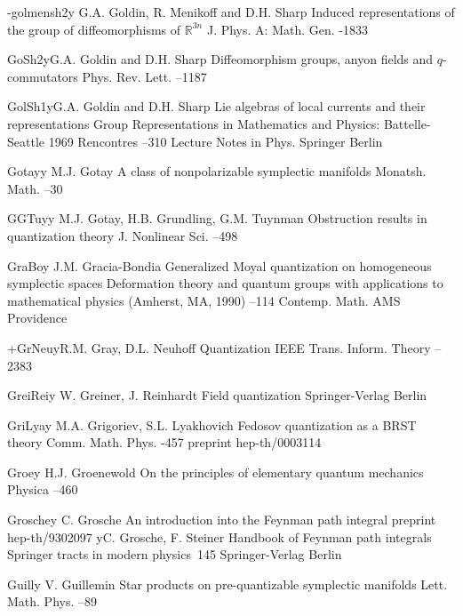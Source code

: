 \documentclass[11pt]{amsart}
\numberwithin{equation}{section}
\theoremstyle{remark}
\newcommand{\by}{\mathbf y}
\begin{document}
\begin{thebibliography}{199}
 -golmensh2\by{ G.A. Goldin, R. Menikoff and D.H. Sharp \paper Induced
representations of the group of diffeomorphisms of ${\mathbb R}^{3n}$ \jour J.
Phys. A: Math. Gen.   -1833}


 GoSh2\by{G.A. Goldin and D.H. Sharp \paper Diffeomorphism groups, anyon fields and
$q$-commutators \jour Phys. Rev. Lett.   --1187}

 GolSh1\by{G.A. Goldin and D.H. Sharp \paper Lie algebras of local currents
and their representations \inbook Group Representations in Mathematics and Physics:
Battelle-Seattle 1969 Rencontres --310 \bookinfo Lecture Notes in Phys. 
\publ Springer \publaddr Berlin }


 Gotay\by{ M.J. Gotay \paper A class of nonpolarizable symplectic
manifolds \jour Monatsh. Math.   --30}

 GGTuy\by{ M.J. Gotay, H.B. Grundling, G.M. Tuynman \paper Obstruction
results in quantization theory \jour J. Nonlinear Sci.   --498}

 GraBo\by{ J.M. Gracia-Bondia \paper Generalized Moyal quantization on
homogeneous symplectic spaces \inbook Deformation theory and quantum groups
with applications to mathematical physics (Amherst, MA, 1990) --114
\bookinfo Contemp. Math.  \publ AMS \publaddr Providence }

 +GrNeu\by{R.M. Gray, D.L. Neuhoff \paper Quantization \jour IEEE Trans.
Inform. Theory   --2383}

 GreiRei\by{ W. Greiner, J. Reinhardt \book Field quantization \publ
Springer-Verlag \publaddr Berlin }

 GriLya\by{ M.A. Grigoriev, S.L. Lyakhovich \paper Fedosov quantization as
a BRST theory \jour Comm. Math. Phys.   -457
\paperinfo preprint hep-th/0003114}

 Groe\by{ H.J. Groenewold \paper On the principles of elementary quantum
mechanics \jour Physica   --460}

 Grosche\by{ C. Grosche \paper An introduction into the Feynman path
integral \paperinfo preprint hep-th/9302097 \moreref\by C. Grosche, F. Steiner
\book Handbook of Feynman path integrals \bookinfo Springer tracts in modern
physics~145 \publ Springer-Verlag \publaddr Berlin }

 Guill\by{ V. Guillemin \paper Star products on pre-quantizable symplectic
manifolds \jour Lett. Math. Phys.   --89}


\end{thebibliography}
\end{document}

